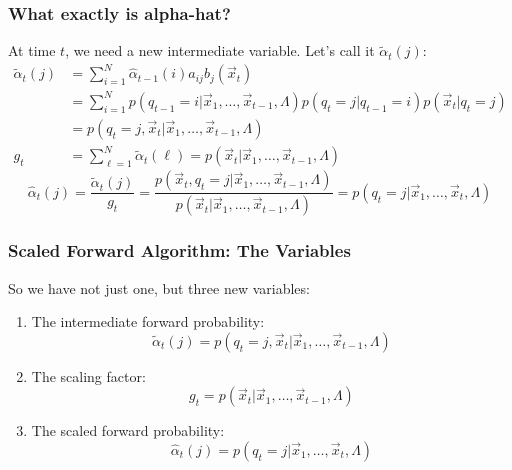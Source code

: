 \documentclass{beamer}
\begin{document}
\begin{frame}
  \frametitle{What exactly is alpha-hat?}
  At time $t$, we need a new intermediate variable.  Let's call it $\tilde\alpha_t(j)$:
  \begin{align*}
  \tilde\alpha_t(j) &= \sum_{i=1}^N \hat\alpha_{t-1}(i) a_{ij}b_j(\vec{x}_t)\\
  &= \sum_{i=1}^N p(q_{t-1}=i|\vec{x}_1,\ldots,\vec{x}_{t-1},\Lambda)p(q_t=j|q_{t-1}=i)p(\vec{x}_t|q_t=j)\\
  &= p(q_{t}=j,\vec{x}_t|\vec{x}_1,\ldots,\vec{x}_{t-1},\Lambda)\\
  g_t &= \sum_{\ell=1}^N \tilde\alpha_t(\ell) = p(\vec{x}_t|\vec{x}_1,\ldots,\vec{x}_{t-1},\Lambda)
  \end{align*}
  \begin{displaymath}
  \hat\alpha_t(j) = \frac{\tilde\alpha_t(j)}{g_t}
  = \frac{p(\vec{x}_t,q_t=j|\vec{x}_1,\ldots,\vec{x}_{t-1},\Lambda)}{p(\vec{x}_t|\vec{x}_1,\ldots,\vec{x}_{t-1},\Lambda)}
  = p(q_t=j|\vec{x}_1,\ldots,\vec{x}_t,\Lambda)
  \end{displaymath}
\end{frame}

\begin{frame}
  \frametitle{Scaled Forward Algorithm: The Variables}

  So we have not just one, but three new variables:
  \begin{enumerate}
  \item The intermediate forward probability:
    \begin{displaymath}
      \tilde\alpha_t(j) = p(q_t=j,\vec{x}_t|\vec{x}_1,\ldots,\vec{x}_{t-1},\Lambda)
    \end{displaymath}
  \item The scaling factor:
    \begin{displaymath}
      g_t = p(\vec{x}_t|\vec{x}_1,\ldots,\vec{x}_{t-1},\Lambda)
    \end{displaymath}
  \item The scaled forward probability:
    \begin{displaymath}
      \hat\alpha_t(j) = p(q_t=j|\vec{x}_1,\ldots,\vec{x}_{t},\Lambda)
    \end{displaymath}
  \end{enumerate}
\end{frame}
\end{document}
